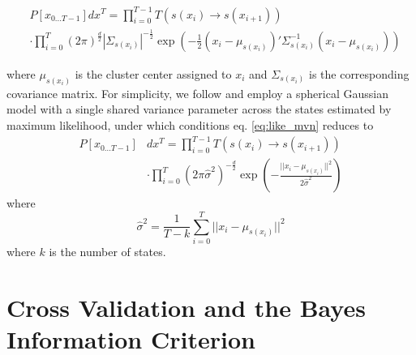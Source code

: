 \documentclass[twocolumn,floatfix,nofootinbib,aps]{revtex4-1}
\begin{document}
\begin{equation}
\label{eq:like_mvn}
\begin{split}
&P[x_{0...T-1}] dx^T = \prod_{i=0}^{T-1} T(s(x_i) \rightarrow s(x_{i+1})) \\
    &\cdot \prod_{i=0}^T \left(2 \pi\right)^\frac{d}{2} |\Sigma_{s(x_i)}|^{-\frac{1}{2}}  \exp\left(-\frac{1}{2} (x_i - \mu_{s(x_i)})' \Sigma_{s(x_i)}^{-1} (x_i - \mu_{s(x_i)})\right)
\end{split}
\end{equation}

where $\mu_{s(x_i)}$ is the cluster center assigned to $x_i$ and $\Sigma_{s(x_i)}$ is the corresponding covariance matrix. For simplicity, we follow \citet{Pelleg2000Xmeans} and employ a spherical Gaussian model with a single shared variance parameter across the states estimated by maximum likelihood, under which conditions eq. \ref{eq:like_mvn} reduces to
\begin{equation}
\label{eq:like_mvn2}
\begin{split}
P[x_{0...T-1}] & dx^T = \prod_{i=0}^{T-1} T(s(x_i) \rightarrow s(x_{i+1})) \\
	&\cdot \prod_{i=0}^T \left(2 \pi \hat{\sigma}^2\right)^{-\frac{d}{2}} \exp\left(-\frac{||x_i - \mu_{s(x_i)}||^2}{2 \hat{\sigma}^2}\right)
\end{split}
\end{equation} where
\begin{equation}
\label{eq:mle_sigma}
\hat{\sigma}^2 = \frac{1}{T - k} \sum_{i=0}^T || x_i - \mu_{s(x_i)} ||^2
\end{equation} where $k$ is the number of states.

\section{Cross Validation and the Bayes Information Criterion}

\end{document}

